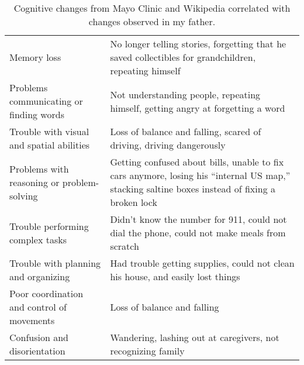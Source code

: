 \documentclass{article}
\begin{document}
\begin{table}[h!]
\centering
\begin{tabularx}{ 0.8\textwidth }{ | >{\raggedright\arraybackslash}X | >{\centering\arraybackslash}X | }
 \hline
 \multicolumn{2}{|c|}{Cognitive Changes in Dad} \\
 \hline
 Memory loss & No longer telling stories, forgetting that he saved collectibles for grandchildren, repeating himself\\
 \hline
 Problems communicating or finding words & Not understanding people, repeating himself, getting angry at forgetting a word  \\
 \hline
 Trouble with visual and spatial abilities & Loss of balance and falling, scared of driving, driving dangerously \\
 \hline
 Problems with reasoning or problem-solving & Getting confused about bills, unable to fix cars anymore, losing his ``internal US map,'' stacking saltine boxes instead of fixing a broken lock \\
 \hline
 Trouble performing complex tasks & Didn't know the number for 911, could not dial the phone, could not make meals from scratch \\
 \hline
 Trouble with planning and organizing & Had trouble getting supplies, could not clean his house, and easily lost things \\
 \hline
 Poor coordination and control of movements & Loss of balance and falling \\
 \hline
 Confusion and disorientation & Wandering, lashing out at caregivers, not recognizing family  \\
 \hline
\end{tabularx}
\caption{Cognitive changes from Mayo Clinic and Wikipedia correlated with changes observed in my father.}
\end{table}
\end{document}
